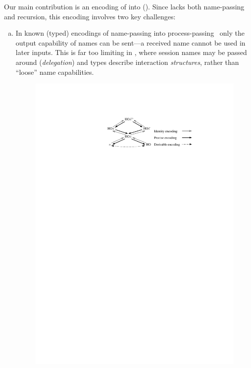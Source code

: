 Our main contribution is 
an encoding of \HOp into \HO ().  
Since \HO lacks 
both name-passing and recursion, this encoding involves two key challenges:
\begin{enumerate}[a.]
\item In known (typed) 
encodings of name-passing into process-passing~\cite{SaWabook} %
only the output capability of names can be sent---a received name cannot be used in later inputs.
This is far too limiting in \HOp, where 
 session names %
 may be passed around (\emph{delegation})
and types describe interaction  \emph{structures}, rather than ``loose'' name capabilities. %

\begin{figure}[t]
\centering
\includegraphics[scale=1]{diag.pdf}


\end{figure}
\end{enumerate}
